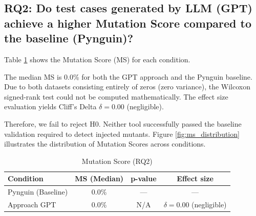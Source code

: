 \subsection{RQ2: Do test cases generated by LLM (GPT) achieve a higher Mutation Score compared to the baseline (Pynguin)?}

Table \ref{tab:rq2} shows the Mutation Score (MS) for each condition. 

The median MS is 0.0\% for both the GPT approach and the Pynguin baseline. Due to both datasets consisting entirely of zeros (zero variance), the Wilcoxon signed-rank test could not be computed mathematically. The effect size evaluation yields Cliff's Delta $\delta = 0.00$ (negligible). 

Therefore, we fail to reject H0. Neither tool successfully passed the baseline validation required to detect injected mutants. Figure \ref{fig:ms_distribution} illustrates the distribution of Mutation Scores across conditions.

\begin{table}[h]
\centering
\caption{Mutation Score (RQ2)}
\label{tab:rq2}
\begin{tabular}{lccc}
\hline
\textbf{Condition} & \textbf{MS (Median)} & \textbf{p-value} & \textbf{Effect size} \\ \hline
Pynguin (Baseline) & 0.0\% & --- & --- \\
Approach GPT & 0.0\% & N/A & $\delta=0.00$ (negligible) \\ \hline
\end{tabular}
\end{table}
